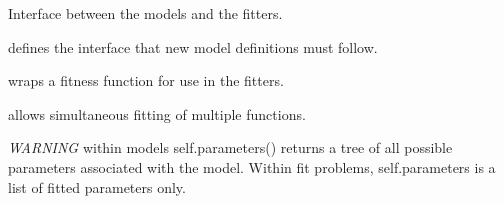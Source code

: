 \documentclass[letterpaper,10pt,english]{sphinxmanual}
\begin{document}
\label{api/fitproblem:module-refl1d.fitproblem}
Interface between the models and the fitters.

{\hyperref[api/fitproblem:refl1d.fitproblem.Fitness]{}} defines the interface that new model definitions must follow.

{\hyperref[api/fitproblem:refl1d.fitproblem.FitProblem]{}} wraps a fitness function for use in the fitters.

{\hyperref[api/fitproblem:refl1d.fitproblem.MultiFitProblem]{}} allows simultaneous fitting of multiple functions.

\emph{WARNING} within models self.parameters() returns a tree of all possible
parameters associated with the model.  Within fit problems, self.parameters
is a list of fitted parameters only.
\end{document}
